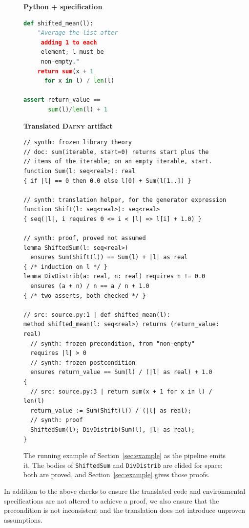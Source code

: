 \documentclass[11pt,letterpaper]{article}
\newcommand{\daf}{\textsc{Dafny}}
\begin{document}
\begin{figure}[t]
\centering
\begin{minipage}[t]{0.30\textwidth}
\footnotesize\textbf{Python + specification}
\begin{lstlisting}[language=Python,style=fig]
def shifted_mean(l):
    "Average the list after
     adding 1 to each
     element; l must be
     non-empty."
    return sum(x + 1
      for x in l) / len(l)

assert return_value ==
       sum(l)/len(l) + 1
\end{lstlisting}
\end{minipage}\hfill
\begin{minipage}[t]{0.66\textwidth}
\footnotesize\textbf{Translated \daf{} artifact}
\begin{lstlisting}[language=Dafny,style=fig]
// synth: frozen library theory
// doc: sum(iterable, start=0) returns start plus the
// items of the iterable; on an empty iterable, start.
function Sum(l: seq<real>): real
{ if |l| == 0 then 0.0 else l[0] + Sum(l[1..]) }

// synth: translation helper, for the generator expression
function Shift(l: seq<real>): seq<real>
{ seq(|l|, i requires 0 <= i < |l| => l[i] + 1.0) }

// synth: proof, proved not assumed
lemma ShiftedSum(l: seq<real>)
  ensures Sum(Shift(l)) == Sum(l) + |l| as real
{ /* induction on l */ }
lemma DivDistrib(a: real, n: real) requires n != 0.0
  ensures (a + n) / n == a / n + 1.0
{ /* two asserts, both checked */ }

// src: source.py:1 | def shifted_mean(l):
method shifted_mean(l: seq<real>) returns (return_value: real)
  // synth: frozen precondition, from "non-empty"
  requires |l| > 0
  // synth: frozen postcondition
  ensures return_value == Sum(l) / (|l| as real) + 1.0
{
  // src: source.py:3 | return sum(x + 1 for x in l) / len(l)
  return_value := Sum(Shift(l)) / (|l| as real);
  // synth: proof
  ShiftedSum(l); DivDistrib(Sum(l), |l| as real);
}
\end{lstlisting}
\end{minipage}
\caption{The running example of Section~\ref{sec:example} as the pipeline
emits it. The bodies of \texttt{ShiftedSum} and \texttt{DivDistrib} are elided
for space; both are proved, and Section~\ref{sec:example} gives those proofs.}
\label{fig:example}
\end{figure}

In addition to the above checks to ensure the translated code and environmental specifications
are not altered to achieve a proof, we also ensure that the precondition is not inconsistent and 
the translation does not introduce unproven assumptions. 
\end{document}
